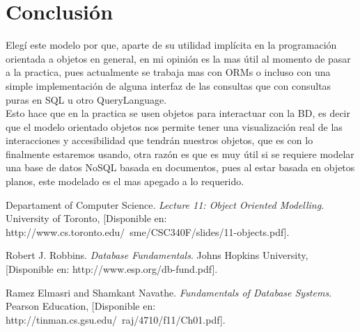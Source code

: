 \documentclass[spanish,12pt,letterpapper]{article}
\begin{document}
    \section{Conclusión}
    Elegí este modelo por que, aparte de su utilidad implícita en la programación orientada a objetos en general, en mi opinión es la mas útil al momento de pasar a la practica, pues actualmente se trabaja mas con ORMs o incluso con una simple implementación de alguna interfaz de las consultas que con consultas puras en SQL u otro QueryLanguage.\\
    
    Esto hace que en la practica se usen objetos para interactuar con la BD, es decir que el modelo orientado objetos nos permite tener una visualización real de las interacciones y accesibilidad que tendrán nuestros objetos, que es con lo finalmente estaremos usando, otra razón es que es muy útil si se requiere modelar una base de datos NoSQL basada en documentos, pues al estar basada en objetos planos, este modelado es el mas apegado a lo requerido.
	
	\pagebreak
	\begin{thebibliography}{9}	
	
	 Departament of Computer Science. 
		\emph{Lecture 11: Object Oriented Modelling}. University of Toronto, [Disponible en: http://www.cs.toronto.edu/~sme/CSC340F/slides/11-objects.pdf].
	
		 Robert J. Robbins. 
		\emph{Database Fundamentals}. Johns Hopkins University, [Disponible en: http://www.esp.org/db-fund.pdf].
		
		 Ramez Elmasri and Shamkant Navathe. 
		\emph{Fundamentals of Database Systems}. Pearson Education, [Disponible en: http://tinman.cs.gsu.edu/~raj/4710/f11/Ch01.pdf].

	\end{thebibliography}
\end{document}

